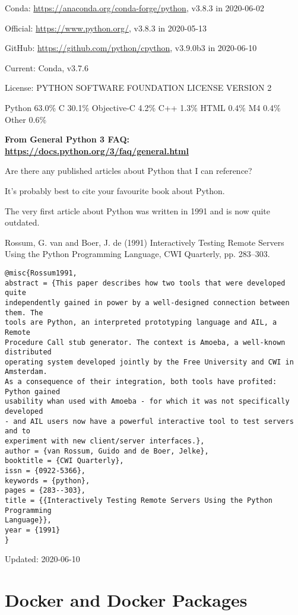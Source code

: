\documentclass[]{article}
\begin{document}
Conda: \url{https://anaconda.org/conda-forge/python}, v3.8.3 in 2020-06-02

Official: \url{https://www.python.org/}, v3.8.3 in 2020-05-13

GitHub: \url{https://github.com/python/cpython}, v3.9.0b3 in 2020-06-10

Current: Conda, v3.7.6

License: PYTHON SOFTWARE FOUNDATION LICENSE VERSION 2

Python 63.0\% C 30.1\% Objective-C 4.2\% C++ 1.3\% HTML 0.4\% M4 0.4\% Other 0.6\% 

\textbf{From General Python 3 FAQ: \url{https://docs.python.org/3/faq/general.html}}

Are there any published articles about Python that I can reference?

It's probably best to cite your favourite book about Python.

The very first article about Python was written in 1991 and is now quite outdated.

Rossum, G. van and Boer, J. de (1991) Interactively Testing Remote Servers Using the Python Programming Language, CWI Quarterly, pp. 283–303.

\begin{verbatim}
@misc{Rossum1991,
abstract = {This paper describes how two tools that were developed quite 
independently gained in power by a well-designed connection between them. The 
tools are Python, an interpreted prototyping language and AIL, a Remote
Procedure Call stub generator. The context is Amoeba, a well-known distributed
operating system developed jointly by the Free University and CWI in Amsterdam.
As a consequence of their integration, both tools have profited: Python gained
usability whan used with Amoeba - for which it was not specifically developed
- and AIL users now have a powerful interactive tool to test servers and to
experiment with new client/server interfaces.},
author = {van Rossum, Guido and de Boer, Jelke},
booktitle = {CWI Quarterly},
issn = {0922-5366},
keywords = {python},
pages = {283--303},
title = {{Interactively Testing Remote Servers Using the Python Programming
Language}},
year = {1991}
}
\end{verbatim}

Updated: 2020-06-10

\part{Docker and Docker Packages}
\end{document}
